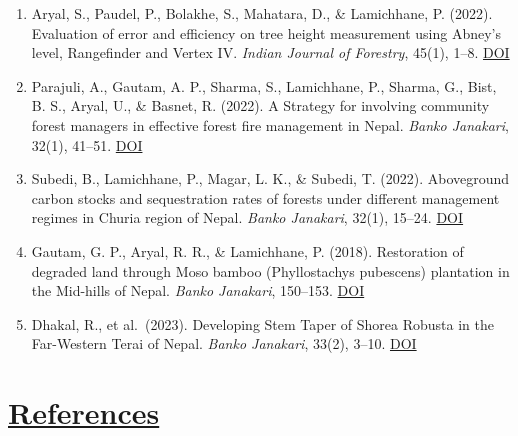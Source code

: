 \documentclass[
]{article}
\providecommand{\tightlist}{%
  \setlength{\itemsep}{0pt}\setlength{\parskip}{0pt}}
\begin{document}
\begin{enumerate}
\def\labelenumi{\arabic{enumi}.}
\tightlist
\item
  Aryal, S., Paudel, P., Bolakhe, S., Mahatara, D., \& Lamichhane, P.
  (2022). Evaluation of error and efficiency on tree height measurement
  using Abney's level, Rangefinder and Vertex IV. \emph{Indian Journal
  of Forestry}, 45(1), 1--8.
  \href{https://doi.org/10.54207/bsmps1000-2022-49P4F8}{DOI}
\item
  Parajuli, A., Gautam, A. P., Sharma, S., Lamichhane, P., Sharma, G.,
  Bist, B. S., Aryal, U., \& Basnet, R. (2022). A Strategy for involving
  community forest managers in effective forest fire management in
  Nepal. \emph{Banko Janakari}, 32(1), 41--51.
  \href{https://doi.org/10.3126/banko.v32i1.45476}{DOI}
\item
  Subedi, B., Lamichhane, P., Magar, L. K., \& Subedi, T. (2022).
  Aboveground carbon stocks and sequestration rates of forests under
  different management regimes in Churia region of Nepal. \emph{Banko
  Janakari}, 32(1), 15--24.
  \href{https://doi.org/10.3126/banko.v32i1.45442}{DOI}
\item
  Gautam, G. P., Aryal, R. R., \& Lamichhane, P. (2018). Restoration of
  degraded land through Moso bamboo (Phyllostachys pubescens) plantation
  in the Mid-hills of Nepal. \emph{Banko Janakari}, 150--153.
  \href{https://doi.org/10.3126/banko.v27i3.20560}{DOI}
\item
  Dhakal, R., et al.~(2023). Developing Stem Taper of Shorea Robusta in
  the Far-Western Terai of Nepal. \emph{Banko Janakari}, 33(2), 3--10.
  \href{https://doi.org/10.3126/banko.v33i2.58809}{DOI}
\end{enumerate}

\section{\texorpdfstring{\underline{References}}{}}\label{section-9}

\small
\end{document}

